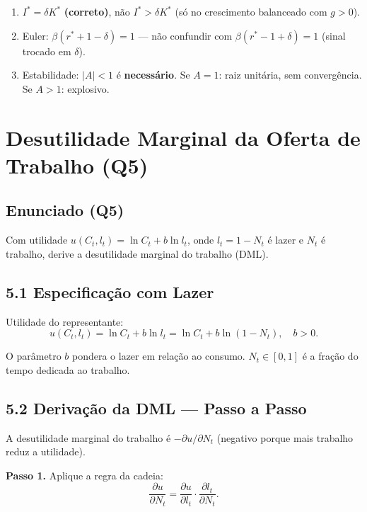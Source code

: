 \documentclass[12pt, a4paper]{article}
\begin{document}
\begin{provabox}[title={Q4 --- Erros Frequentes}]
\begin{enumerate}
\item $I^* = \delta K^*$ \textbf{(correto)}, não $I^* > \delta K^*$ (só no crescimento balanceado com $g>0$).
\item Euler: $\beta(r^*+1-\delta)=1$ --- não confundir com $\beta(r^*-1+\delta)=1$ (sinal trocado em $\delta$).
\item Estabilidade: $|A|<1$ é \textbf{necessário}. Se $A=1$: raiz unitária, sem convergência. Se $A>1$: explosivo.
\end{enumerate}
\end{provabox}

\section{Desutilidade Marginal da Oferta de Trabalho (Q5)}

\subsection*{Enunciado (Q5)}

Com utilidade $u(C_t, l_t) = \ln C_t + b\ln l_t$, onde $l_t = 1 - N_t$ é lazer e $N_t$ é trabalho, derive a desutilidade marginal do trabalho (DML).

\subsection*{5.1 Especificação com Lazer}

Utilidade do representante:
\[
u(C_t, l_t) = \ln C_t + b\ln l_t = \ln C_t + b\ln(1-N_t), \quad b > 0.
\]

O parâmetro $b$ pondera o lazer em relação ao consumo. $N_t \in [0,1]$ é a fração do tempo dedicada ao trabalho.

\subsection*{5.2 Derivação da DML --- Passo a Passo}

A desutilidade marginal do trabalho é $-\partial u/\partial N_t$ (negativo porque mais trabalho reduz a utilidade).

\textbf{Passo 1.} Aplique a regra da cadeia:
\[
\frac{\partial u}{\partial N_t} = \frac{\partial u}{\partial l_t}\cdot\frac{\partial l_t}{\partial N_t}.
\]
\end{document}
